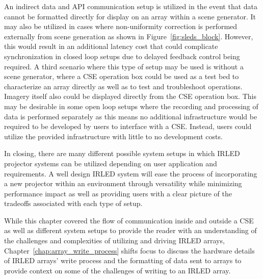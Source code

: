         An indirect data and API communication setup is utilized in the event that data cannot be formatted directly for display on an array within a scene generator. It may also be utilized in cases where non-uniformity correction is performed externally from scene generation as shown in Figure~\ref{fig:sleds_block}. However, this would result in an additional latency cost that could complicate synchronization in closed loop setups due to delayed feedback control being required. A third scenario where this type of setup may be used is without a scene generator, where a CSE operation box could be used as a test bed to characterize an array directly as well as to test and troubleshoot operations. Imagery itself also could be displayed directly from the CSE operation box. This may be desirable in some open loop setups where the recording and processing of data is performed separately as this means no additional infrastructure would be required to be developed by users to interface with a CSE. Instead, users could utilize the provided infrastructure with little to no development costs.

        In closing, there are many different possible system setups in which IRLED projector systems can be utilized depending on user application and requirements. A well design IRLED system will ease the process of incorporating a new projector within an environment through versatility while minimizing performance impact as well as providing users with a clear picture of the tradeoffs associated with each type of setup.

        While this chapter covered the flow of communication inside and outside a CSE as well as different system setups to provide the reader with an understanding of the challenges and complexities of utilizing and driving IRLED arrays, Chapter~\ref{chap:array_write_process} shifts focus to discuss the hardware details of IRLED arrays' write process and the formatting of data sent to arrays to provide context on some of the challenges of writing to an IRLED array.
